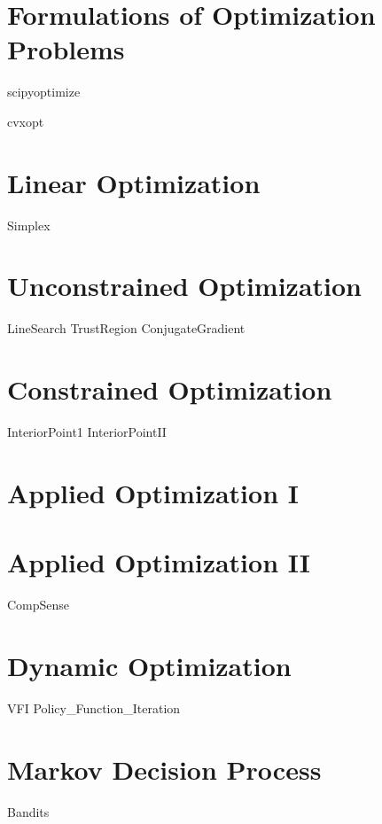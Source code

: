 \documentclass[nociteref]{SIAM-GH-book}
\begin{document}
\part{Formulations of Optimization Problems}
{scipyoptimize}

{cvxopt}

\part{Linear Optimization}
{Simplex}


\part{Unconstrained Optimization}
{LineSearch}
{TrustRegion}
{ConjugateGradient}

\part{Constrained Optimization}
{InteriorPoint1}
{InteriorPointII}

\part{Applied Optimization I}

\part{Applied Optimization II}
{CompSense}

\part{Dynamic Optimization}
{VFI}
{Policy_Function_Iteration}

\part{Markov Decision Process}
{Bandits}
\end{document}
